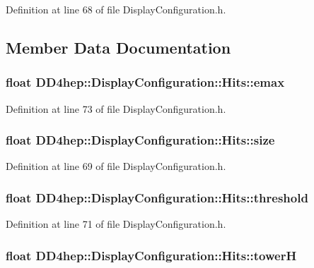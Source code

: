 Definition at line 68 of file DisplayConfiguration.h.

\subsection{Member Data Documentation}
\hypertarget{struct_d_d4hep_1_1_display_configuration_1_1_hits_ad38efa49f6d6183fd60e34e3d53756a1}{
\subsubsection[{emax}]{\setlength{\rightskip}{0pt plus 5cm}float {\bf DD4hep::DisplayConfiguration::Hits::emax}}}
\label{struct_d_d4hep_1_1_display_configuration_1_1_hits_ad38efa49f6d6183fd60e34e3d53756a1}


Definition at line 73 of file DisplayConfiguration.h.\hypertarget{struct_d_d4hep_1_1_display_configuration_1_1_hits_ad11b0d78e70f65eab8742ec341a48bd8}{
\subsubsection[{size}]{\setlength{\rightskip}{0pt plus 5cm}float {\bf DD4hep::DisplayConfiguration::Hits::size}}}
\label{struct_d_d4hep_1_1_display_configuration_1_1_hits_ad11b0d78e70f65eab8742ec341a48bd8}


Definition at line 69 of file DisplayConfiguration.h.\hypertarget{struct_d_d4hep_1_1_display_configuration_1_1_hits_ae708bf5cabed5cb9c82734b7bfac0373}{
\subsubsection[{threshold}]{\setlength{\rightskip}{0pt plus 5cm}float {\bf DD4hep::DisplayConfiguration::Hits::threshold}}}
\label{struct_d_d4hep_1_1_display_configuration_1_1_hits_ae708bf5cabed5cb9c82734b7bfac0373}


Definition at line 71 of file DisplayConfiguration.h.\hypertarget{struct_d_d4hep_1_1_display_configuration_1_1_hits_a5c2fc0074ea8321a2cea82b3fc856584}{
\subsubsection[{towerH}]{\setlength{\rightskip}{0pt plus 5cm}float {\bf DD4hep::DisplayConfiguration::Hits::towerH}}}
\label{struct_d_d4hep_1_1_display_configuration_1_1_hits_a5c2fc0074ea8321a2cea82b3fc856584}


